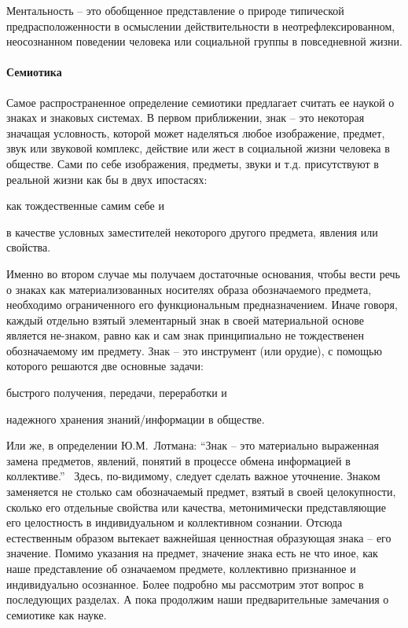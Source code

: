 Ментальность -- это обобщенное представление о природе типической предрасположенности
в осмыслении действительности в неотрефлексированном, неосознанном поведении человека или
социальной группы в повседневной жизни.

\paragraph{Семиотика}\label{1.1.3}
Самое распространенное определение семиотики предлагает считать ее наукой о знаках и
знаковых системах. В первом приближении, знак -- это некоторая значащая условность,
которой может наделяться любое изображение, предмет, звук или звуковой комплекс,
действие или жест в социальной жизни человека в обществе. Сами по себе изображения,
предметы, звуки и т.д. присутствуют в реальной жизни как бы в двух ипостасях:
\begin{enumerate*}[label=\asbuk*)]
\item как тождественные самим себе и
\item в качестве условных заместителей некоторого другого предмета, явления или свойства.
\end{enumerate*}

Именно во втором случае мы получаем достаточные основания,
чтобы вести речь о знаках как материализованных носителях образа обозначаемого предмета,
необходимо ограниченного его функциональным предназначением. Иначе говоря, каждый отдельно взятый
элементарный знак в своей материальной основе является не-знаком, равно как и сам знак принципиально
не тождественен обозначаемому им предмету. Знак -- это инструмент (или орудие),
с помощью которого решаются две основные задачи:
\begin{inparaenum}[\itshape 1\upshape)]
    \item быстрого получения, передачи, переработки и
    \item надежного хранения знаний/информации в обществе.
\end{inparaenum}

Или же, в определении Ю.М.~Лотмана: ``Знак -- это материально выраженная замена
предметов, явлений, понятий в процессе обмена информацией в коллективе.''~\autocite{wiki:symbol}
Здесь, по-видимому, следует сделать важное уточнение. Знаком заменяется не столько сам
обозначаемый предмет, взятый в своей целокупности, сколько его отдельные свойства или
качества, метонимически представляющие его целостность в индивидуальном и коллективном сознании.
Отсюда естественным образом вытекает важнейшая ценностная образующая знака -- его значение.
Помимо указания на предмет, значение знака есть не что иное, как наше представление об означаемом
предмете, коллективно признанное и индивидуально осознанное. Более подробно мы рассмотрим
этот вопрос в последующих разделах. А пока продолжим наши предварительные замечания о семиотике как науке.

